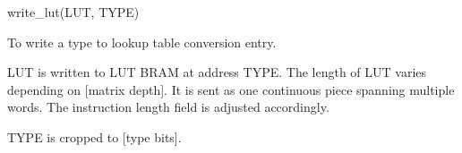 

\format
write\_lut(LUT, TYPE)

\purpose

To write a type to lookup table conversion entry.

\description

LUT is written to LUT BRAM at address TYPE.
The length of LUT varies depending on [matrix depth].
It is sent as one continuous piece spanning multiple words.
The instruction length field is adjusted accordingly.

\notes

TYPE is cropped to [type bits].
